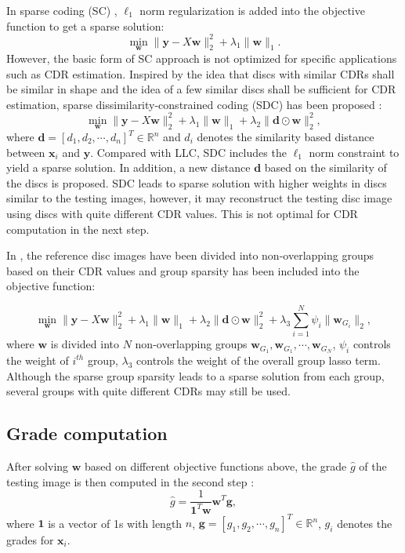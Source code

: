 \documentclass[journal]{IEEEtran}
\begin{document}
 In sparse coding (SC) \cite{sparsecoding}, $\ell_1$ norm regularization is added into the objective function to get a sparse solution:
       \begin{equation}
   \min_{\textbf{w}} \|{\textbf{y}}-{X}\textbf{w}\|^2_2+\lambda_1 \|\textbf{w}\|_1.  \label{scobj} 
   \end{equation} 
      However, the basic form of SC approach is not optimized for specific applications such as CDR estimation. 
      Inspired by the idea that discs with similar CDRs shall be similar in shape and the idea of a few similar discs shall be sufficient for CDR estimation,  sparse dissimilarity-constrained coding (SDC) has been proposed \cite{CJ15}:
      \begin{equation} \min_{\textbf{w}}\|{\textbf{y}}-{X}\textbf{w}\|^2_2+ \lambda_1 \|\textbf{w}\|_1+ \lambda_2\| \textbf{d}\odot \textbf{w}\|_2^2, 
    \end{equation} 
      where $\textbf{d}=[d_1, d_2, \cdots, d_n]^T\in \mathbb{R}^n$ and $d_i$ denotes the similarity based distance  between $\textbf{x}_i$ and $\textbf{y}$. 
    Compared with LLC, SDC includes the $\ell_1$ norm constraint to yield a sparse solution. In addition, a new distance $\textbf{d}$ based on  the similarity  of the discs is proposed. 
   SDC leads to sparse solution with higher weights in discs similar to the testing images, however, it may reconstruct the testing disc image using discs with quite different CDR values. This is not optimal for CDR computation in the next step. 
    
    In \cite{Cheng:17BOE}, the reference disc images have been divided into non-overlapping groups based on their CDR values  and  group sparsity has been included into the objective function:
    
      \begin{equation} \min_{\textbf{w}}\|{\textbf{y}}-{X}\textbf{w}\|^2_2+ \lambda_1 \|\textbf{w}\|_1+ \lambda_2\| \textbf{d}\odot \textbf{w}\|_2^2+\lambda_3   \sum_{i=1}^N\psi_i\|\textbf{w}_{G_i}\|_2,   
    \end{equation} 
   where $\textbf{w}$ is divided into $N$ non-overlapping groups $\textbf{w}_{G_1}, \textbf{w}_{G_1}, \cdots, \textbf{w}_{G_N}$, $\psi_i$ controls the weight of $i^{th}$ group,
   ${\lambda_3}$ controls the weight of the overall group lasso term.
   Although the sparse group sparsity leads to a sparse solution from each group, several groups with quite different CDRs may still be used. 
   
       \subsection{Grade computation}
   After solving $\textbf{w}$   based on different objective functions above,  the grade $\hat{g}$  of the testing image is then computed in the second step \cite{CJ15}:
  \begin{equation}
  \hat{g}=\frac{1}{\textbf{1}^T\textbf{w}}\textbf{w}^T\textbf{g} ,   \label{eq5}
  \end{equation} 
  where $\textbf{1}$ is a vector of 1s with length $n$, $\textbf{g}=[g_1, g_2, \cdots, g_n]^T\in \mathbb{R}^n$, $g_i$ denotes the grades for $\textbf{x}_i$. 
 
\end{document}
